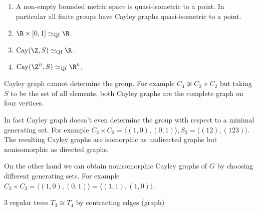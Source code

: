 \documentclass[a4paper]{article}
\DeclareMathOperator{\Cay}{Cay} %
\begin{document}
\begin{eg}\leavevmode
  \begin{enumerate}
  \item A non-empty bounded metric space is quasi-isometric to a point. In particular all finite groups have Cayley graphs quasi-isometric to a point.
  \item \(\R \times [0, 1] \simeq_{\mathrm{QI}} \R\).
  \item \(\Cay(\Z, S) \simeq_{\mathrm{QI}} \R\).
  \item \(\Cay(\Z^n, S) \simeq_{\mathrm{QI}} \R^n\).
  \end{enumerate}
\end{eg}

\begin{eg}
  Cayley graph cannot determine the group. For example \(C_4 \ncong C_2 \times C_2\) but taking \(S\) to be the set of all elements, both Cayley graphs are the complete graph on four vertices.

  In fact Cayley graph doesn't even determine the group with respect to a minimal generating set. For example \(C_2 \times C_3 = \langle (1, 0), (0, 1) \rangle, S_3 = \langle (12), (123) \rangle\). The resulting Cayley graphs are isomorphic as undirected graphs but nonisomorphic as directed graphs. 

  On the other hand we can obtain nonisomorphic Cayley graphs of \(G\) by choosing different generating sets. For example \(C_2 \times C_3 = \langle(1, 0), (0, 1)\rangle = \langle (1, 1), (1, 0) \rangle\).
\end{eg}

\begin{eg}
  3 regular trees \(T_3 \cong T_4\) by contracting edges (graph)
\end{eg}
\end{document}
